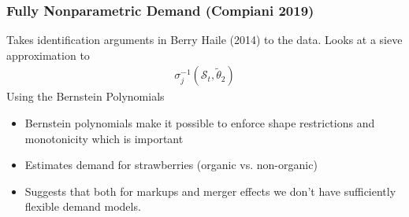 \documentclass[xcolor=pdftex,dvipsnames,table,mathserif,aspectratio=169]{beamer}
\begin{document}
\begin{frame}
\frametitle{Fully Nonparametric Demand (Compiani 2019)}
Takes identification arguments in Berry Haile (2014) to the data. Looks at a sieve approximation to
\begin{align*}
\sigma_{j}^{-1}(\mathcal{S}_t,\widetilde{\theta}_2)
\end{align*}
Using the \alert{Bernstein Polynomials}
\begin{itemize}
\item Bernstein polynomials make it possible to enforce shape restrictions and \alert{monotonicity} which is important
\item Estimates demand for strawberries (organic vs. non-organic)
\item Suggests that both for markups and merger effects we don't have sufficiently flexible demand models.
\end{itemize}
\end{frame}


%
%



%
\end{document}
